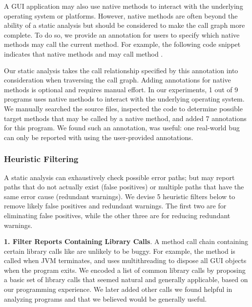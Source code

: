 A GUI application may also use native methods to interact with the underlying
operating system or platforms. However, native methods are often
beyond the ability of a static analysis but should be considered to make
the call graph more complete. To do so, we provide an annotation 
for users to specify which native methods may call the current method. For example,
the following code snippet indicates that native methods  and 
may call method .

{}

{}


Our static analysis takes the call relationship specified by this
annotation into consideration when traversing the call graph. 
Adding annotations for native methods is optional and requires manual effort.
In our experiments, 1 out of 9 programs uses native methods to interact with
the underlying operating system. We manually
searched the source files, inspected the code to determine possible target methods
that may be called by a native method, and added 7 annotations for this program.
We found such an annotation, was useful: one real-world bug
can only be reported with using the user-provided annotations.

\subsubsection{Heuristic Filtering}
\label{sec:heuristic}

A static analysis can exhaustively check possible error paths; but may report
paths that do not actually exist (false positives) or multiple paths
 that have the same error cause (redundant warnings). We devise
5 heuristic filters below to remove likely false positives and redundant warnings.
The first two are for eliminating false positives, while the
other three are for reducing redundant warnings.




\textbf{1. Filter Reports Containing Library Calls}. A
method call chain containing certain library calls
like  are unlikely to
be buggy. For example, the 
method is called when JVM terminates, and uses multithreading
to dispose all GUI objects when the program exits.
We encoded a list of common library calls by proposing
a basic set of library calls that seemed natural and
generally applicable, based on our programming experience.
We later added other calls we found helpful in analyzing
programs and that we believed would be generally useful.

